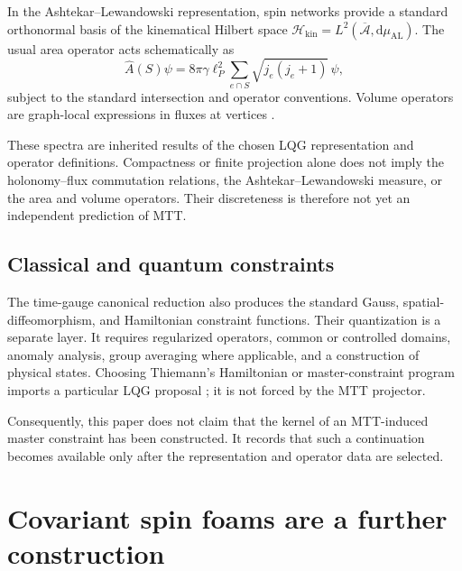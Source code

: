 \documentclass[11pt]{article}
\theoremstyle{plain}
\newcommand{\Acal}{\mathcal A}
\newcommand{\Hkin}{\mathcal H_{\mathrm{kin}}}
\begin{document}
In the Ashtekar--Lewandowski representation, spin networks provide a standard
orthonormal basis of the kinematical Hilbert space
\(\Hkin=L^2(\overline{\Acal},\mathrm d\mu_{\mathrm{AL}})\).
The usual area operator acts schematically as
\begin{equation}
\label{eq:area}
 \widehat A(S)\psi
 =
 8\pi\gamma\ell_P^2
 \sum_{e\cap S}
 \sqrt{j_e(j_e+1)}\,\psi ,
\end{equation}
subject to the standard intersection and operator conventions. Volume
operators are graph-local expressions in fluxes at vertices
\cite{RovelliSmolin1995,AshtekarLewandowski1997}.

These spectra are inherited results of the chosen LQG representation and
operator definitions. Compactness or finite projection alone does not imply
the holonomy--flux commutation relations, the Ashtekar--Lewandowski measure,
or the area and volume operators. Their discreteness is therefore not yet an
independent prediction of MTT.

\subsection{Classical and quantum constraints}

The time-gauge canonical reduction also produces the standard Gauss,
spatial-diffeomorphism, and Hamiltonian constraint functions. Their
quantization is a separate layer. It requires regularized operators, common
or controlled domains, anomaly analysis, group averaging where applicable,
and a construction of physical states. Choosing Thiemann's Hamiltonian or
master-constraint program imports a particular LQG proposal
\cite{Thiemann2007,ThiemannMaster2006}; it is not forced by the MTT
projector.

Consequently, this paper does not claim that the kernel of an MTT-induced
master constraint has been constructed. It records that such a continuation
becomes available only after the representation and operator data are
selected.

\section{Covariant spin foams are a further construction}
\end{document}
